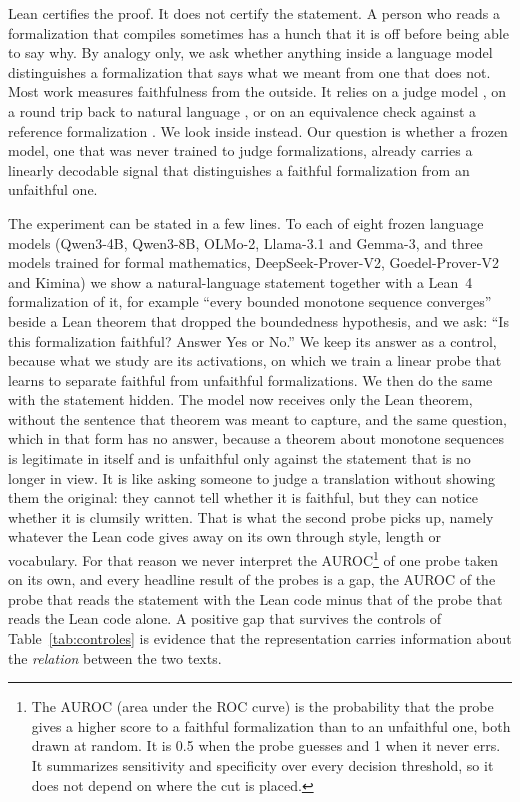 \documentclass[10pt]{article}
\begin{document}
Lean certifies the proof. It does not certify the statement. A person who reads a formalization that compiles
sometimes has a hunch that it is off before being able to say why. By analogy only, we ask whether anything inside a
language model distinguishes a formalization that says what we meant from one that does not.
Most work measures faithfulness from the outside. It relies on a judge model
\citep{criticlean,formalalign,zhang2026beyondcompilation,wang2026formalrx}, on a round trip back to natural language
\citep{amrollahi2026roundtrip}, or on an equivalence check against a reference formalization
\citep{proofnetverif,mohammad2026faithfulnessgap}. We look inside instead. Our question is whether a frozen model,
one that was never trained to judge formalizations, already carries a linearly decodable signal that distinguishes a
faithful formalization from an unfaithful one.

The experiment can be stated in a few lines. To each of eight frozen language models (Qwen3-4B, Qwen3-8B, OLMo-2,
Llama-3.1 and Gemma-3, and three models trained for formal mathematics, DeepSeek-Prover-V2, Goedel-Prover-V2 and
Kimina) we show a natural-language statement together with a Lean~4 formalization of it, for example ``every bounded
monotone sequence converges'' beside a Lean theorem that dropped the boundedness hypothesis, and we ask: ``Is this
formalization faithful? Answer Yes or No.'' We keep its answer as a control, because what we study are its
activations, on which we train a linear probe that learns to separate faithful from unfaithful formalizations. We then
do the same with the statement hidden. The model now receives only the Lean theorem, without the sentence that theorem
was meant to capture, and the same question, which in that form has no answer, because a theorem about monotone
sequences is legitimate in itself and is unfaithful only against the statement that is no longer in view. It is like
asking someone to judge a translation without showing them the original: they cannot tell whether it is faithful, but
they can notice whether it is clumsily written. That is what the second probe picks up, namely whatever the Lean code
gives away on its own through style, length or vocabulary. For that reason we never interpret the AUROC\footnote{The
AUROC (area under the ROC curve) is the probability that the probe gives a higher score to a faithful formalization
than to an unfaithful one, both drawn at random. It is 0.5 when the probe guesses and 1 when it never errs. It
summarizes sensitivity and specificity over every decision threshold, so it does not depend on where the cut is
placed.} of one probe taken on its own, and every headline result of the probes is a gap, the AUROC of the probe that
reads the statement with the Lean code minus that of the probe that reads the Lean code alone. A positive gap that
survives the controls of Table~\ref{tab:controles} is evidence that the representation carries information about the
\emph{relation} between the two texts.
\end{document}
